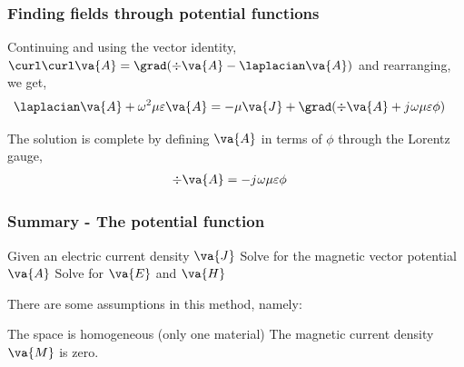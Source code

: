 \documentclass[10pt, compress]{beamer}
\renewcommand{\O}{\omega}  %
\newcommand{\E}{\varepsilon}  %
\renewcommand{\u}{\mu}  %
\renewcommand{\j}{{j}\mkern1mu} %
\begin{document}
\begin{frame}
    \frametitle{Finding fields through potential functions}  
  Continuing and using the vector identity, 
  $\curl \curl \va{A} = \grad ( \div  \va{A} - \laplacian \va{A})$
  and rearranging, we get,
  \begin{align*}
    \laplacian \va{A} + \O^2 \u \E \va{A} &= -\u \va{J} + \grad (\div \va{A} +  \j \O \u \E \phi) 
  \end{align*}

The solution is complete by defining $\va{A}$ in terms of $\phi$ through the Lorentz gauge, 
\begin{align*}
  \div \va{A} &= - \j \O \u \E \phi
\end{align*}
\end{frame}


\begin{frame}
  \frametitle{Summary - The potential function}
  \begin{outline}
    \1 Given an electric current density $\va{J}$
    \1 Solve for the magnetic vector potential $\va{A}$
    \2 Solve for $\va{E}$ and $\va{H}$
  \end{outline}
  There are some assumptions in this method, namely:
  \begin{outline}
    \1 The space is homogeneous (only one material)
    \1 The magnetic current density $\va{M}$ is zero.
  \end{outline}
\end{frame}

  
\end{document}
